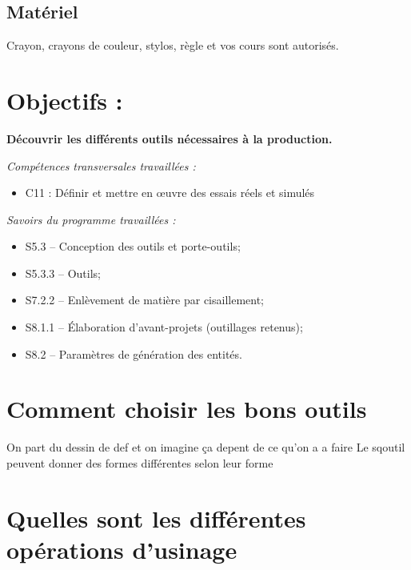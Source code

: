 \documentclass[12pt]{article}
\begin{document}
\subsection{Matériel}

Crayon, crayons de couleur, stylos, règle et vos cours sont autorisés.



\section{Objectifs :}
\begin{center}
\textbf{Découvrir les différents outils nécessaires à la production.}\\
\end{center}

\begin{minipage}[t]{.55\linewidth}
\textit{Compétences transversales travaillées :}
\begin{itemize}
    \item C11 : Définir et mettre en œuvre des essais réels et simulés
\end{itemize}

\end{minipage}
\begin{minipage}[t]{.44\linewidth}
\textit{Savoirs du programme travaillées :}
\begin{itemize}
    \item S5.3 – Conception des outils et porte-outils;
    \item S5.3.3 – Outils;
    \item S7.2.2 – Enlèvement de matière par cisaillement;
    \item S8.1.1 – Élaboration d’avant-projets (outillages retenus);
    \item S8.2 – Paramètres de génération des entités.
\end{itemize}
\end{minipage}

\section{Comment choisir les bons outils}
On part du dessin de def et on imagine
ça depent de ce qu'on a a faire
Le sqoutil peuvent donner des formes différentes selon leur forme 

\section{Quelles sont les différentes opérations d'usinage}
\end{document}
